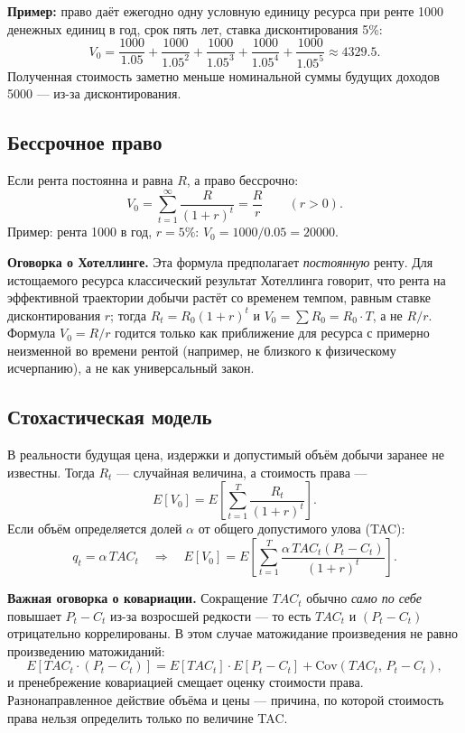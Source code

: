 \documentclass[11pt]{article}
\begin{document}
\textbf{Пример:} право даёт ежегодно одну условную единицу ресурса при ренте 1000 денежных единиц в год, срок пять лет, ставка дисконтирования 5\%:
\[
V_0 = \frac{1000}{1.05}+\frac{1000}{1.05^2}+\frac{1000}{1.05^3}+\frac{1000}{1.05^4}+\frac{1000}{1.05^5} \approx 4329.5.
\]
Полученная стоимость заметно меньше номинальной суммы будущих доходов 5000 — из-за дисконтирования.

\subsection{Бессрочное право}
Если рента постоянна и равна $R$, а право бессрочно:
\[
V_0 = \sum_{t=1}^{\infty} \frac{R}{(1+r)^t} = \frac{R}{r}\qquad (r>0).
\]
Пример: рента 1000 в год, $r=5\%$: $V_0 = 1000/0.05 = 20000$.

\textbf{Оговорка о Хотеллинге.} Эта формула предполагает \emph{постоянную} ренту. Для истощаемого ресурса классический результат Хотеллинга говорит, что рента на эффективной траектории добычи растёт со временем темпом, равным ставке дисконтирования $r$; тогда $R_t=R_0(1+r)^t$ и $V_0=\sum R_0 = R_0\cdot T$, а не $R/r$. Формула $V_0=R/r$ годится только как приближение для ресурса с примерно неизменной во времени рентой (например, не близкого к физическому исчерпанию), а не как универсальный закон.

\subsection{Стохастическая модель}
В реальности будущая цена, издержки и допустимый объём добычи заранее не известны. Тогда $R_t$ — случайная величина, а стоимость права —
\[
E[V_0] = E\!\left[ \sum_{t=1}^{T} \frac{R_t}{(1+r)^t} \right].
\]
Если объём определяется долей $\alpha$ от общего допустимого улова (TAC):
\[
q_t = \alpha\, TAC_t \quad\Rightarrow\quad
E[V_0] = E\!\left[ \sum_{t=1}^{T} \frac{\alpha\, TAC_t(P_t-C_t)}{(1+r)^t} \right].
\]

\textbf{Важная оговорка о ковариации.} Сокращение $TAC_t$ обычно \emph{само по себе} повышает $P_t-C_t$ из-за возросшей редкости — то есть $TAC_t$ и $(P_t-C_t)$ отрицательно коррелированы. В этом случае матожидание произведения не равно произведению матожиданий:
\[
E[TAC_t\cdot(P_t-C_t)] = E[TAC_t]\cdot E[P_t-C_t] + \mathrm{Cov}(TAC_t,\, P_t-C_t),
\]
и пренебрежение ковариацией смещает оценку стоимости права. Разнонаправленное действие объёма и цены — причина, по которой стоимость права нельзя определить только по величине TAC.
\end{document}
